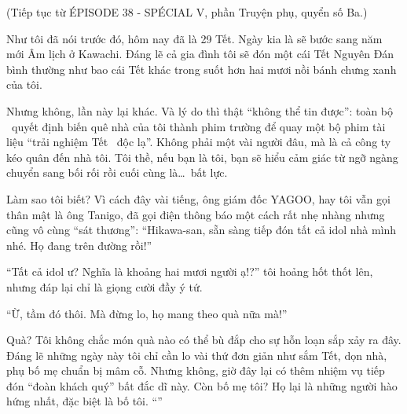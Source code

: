 \documentclass[../main.tex]{subfiles}
\begin{document}
\begin{center}
    (Tiếp tục từ {\flaregothic ÉPISODE 38 - SPÉCIAL {\ab V}}, phần {\abv Truyện phụ}, quyển số Ba.)
\end{center}


Như tôi đã nói trước đó, hôm nay đã là 29 Tết. Ngày kia là sẽ bước sang năm mới Âm lịch ở Kawachi. Đáng lẽ cả gia đình tôi sẽ đón một cái Tết Nguyên Đán bình thường như bao cái Tết khác trong suốt hơn hai mươi nồi bánh chưng xanh của tôi.

Nhưng không, lần này lại khác. Và lý do thì thật ``không thể tin được'': toàn bộ \hll\ quyết định biến quê nhà của tôi thành phim trường để quay một bộ phim tài liệu ``trải nghiệm Tết \ độc lạ''. Không phải một vài người đâu, mà là cả công ty kéo quân đến nhà tôi. Tôi thề, nếu bạn là tôi, bạn sẽ hiểu cảm giác từ ngỡ ngàng chuyển sang bối rối rồi cuối cùng là\dots\ bất lực.

Làm sao tôi biết? Vì cách đây vài tiếng, ông giám đốc YAGOO, hay tôi vẫn gọi thân mật là ông Tanigo, đã gọi điện thông báo một cách rất nhẹ nhàng nhưng cũng vô cùng ``sát thương'': ``Hikawa-san, sẵn sàng tiếp đón tất cả idol nhà mình nhé. Họ đang trên đường rồi!''

``Tất cả idol ư? Nghĩa là khoảng hai mươi người ạ!?'' tôi hoảng hốt thốt lên, nhưng đáp lại chỉ là giọng cười đầy ý tứ.

``Ừ, tầm đó thôi. Mà đừng lo, họ mang theo quà nữa mà!''

Quà? Tôi không chắc món quà nào có thể bù đắp cho sự hỗn loạn sắp xảy ra đây. Đáng lẽ những ngày này tôi chỉ cần lo vài thứ đơn giản như sắm Tết, dọn nhà, phụ bố mẹ chuẩn bị mâm cỗ. Nhưng không, giờ đây lại có thêm nhiệm vụ tiếp đón ``đoàn khách quý'' bất đắc dĩ này. Còn bố mẹ tôi? Họ lại là những người hào hứng nhất, đặc biệt là bố tôi. ``''
\end{document}
